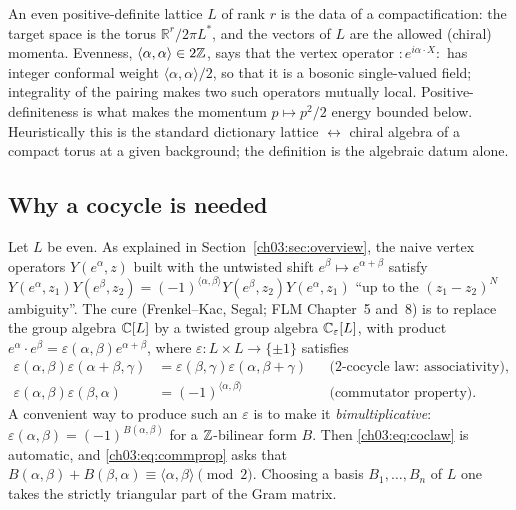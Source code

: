 \begin{physics}
An even positive-definite lattice $L$ of rank $r$ is the data of a compactification: the target space is the torus $\mathbb R^r/2\pi L^*$, and the vectors of $L$ are the allowed (chiral) momenta. Evenness, $\langle\alpha,\alpha\rangle\in2{\mathbb{Z}}$, says that the vertex operator $:\!e^{i\alpha\cdot X}\!:$ has integer conformal weight $\langle\alpha,\alpha\rangle/2$, so that it is a bosonic single-valued field; integrality of the pairing makes two such operators mutually local. Positive-definiteness is what makes the momentum $p\mapsto p^2/2$ energy bounded below. Heuristically this is the standard dictionary lattice $\leftrightarrow$ chiral algebra of a compact torus at a given background; the definition is the algebraic datum alone.
\end{physics}

\subsection{Why a cocycle is needed}

Let $L$ be even. As explained in Section~\ref{ch03:sec:overview}, the naive vertex operators
$Y(e^\alpha,z)$ built with the untwisted shift $e^\beta\mapsto e^{\alpha+\beta}$ satisfy
$Y(e^\alpha,z_1)Y(e^\beta,z_2)=(-1)^{\langle\alpha,\beta\rangle}Y(e^\beta,z_2)Y(e^\alpha,z_1)$
``up to the $(z_1-z_2)^N$ ambiguity''. The cure (Frenkel--Kac, Segal; FLM Chapter~5 and~8) is to
replace the group algebra ${\mathbb{C}}[L]$ by a twisted group algebra ${\mathbb{C}}_\varepsilon[L]$, with product
$e^\alpha\cdot e^\beta=\varepsilon(\alpha,\beta)e^{\alpha+\beta}$, where
$\varepsilon\colon L\times L\to\{\pm1\}$ satisfies
\begin{align}
  \varepsilon(\alpha,\beta)\varepsilon(\alpha+\beta,\gamma)&=\varepsilon(\beta,\gamma)
    \varepsilon(\alpha,\beta+\gamma) &&\text{(2-cocycle law: associativity)},\label{ch03:eq:coclaw}\\
  \varepsilon(\alpha,\beta)\varepsilon(\beta,\alpha)&=(-1)^{\langle\alpha,\beta\rangle}
  &&\text{(commutator property)}.\label{ch03:eq:commprop}
\end{align}
A convenient way to produce such an $\varepsilon$ is to make it \emph{bimultiplicative}:
$\varepsilon(\alpha,\beta)=(-1)^{B(\alpha,\beta)}$ for a ${\mathbb{Z}}$-bilinear form $B$. Then
\eqref{ch03:eq:coclaw} is automatic, and \eqref{ch03:eq:commprop} asks that
$B(\alpha,\beta)+B(\beta,\alpha)\equiv\langle\alpha,\beta\rangle\pmod 2$. Choosing a basis
$B_1,\dots,B_n$ of $L$ one takes the strictly triangular part of the Gram matrix.

